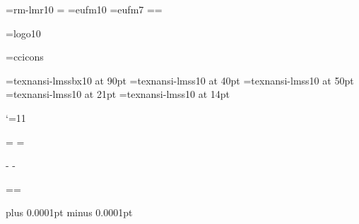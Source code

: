 






\newdimen\hpage \newdimen\vpage %

\def\[{\string\[} %
\def\pdfout#1#2#3{\ifnum#1=1 ^^a7#3 #2\else #2\fi}
\files


\lmfonts\lmtitles\ansifont
 \font\tenrm=rm-lmr10 =\tenrm
\font\frakx=eufm10
\font\frakvii=eufm7
\newfam\frakfam \textfont\frakfam=\frakx \scriptfont\frakfam=\frakvii
\def\frak{\fam\frakfam\frakx}

\font\logo=logo10

\pdfcode
\pdfendcode
\font\ccicons=ccicons
\def\ccbysa{{\ccicons \char0\kern1pt\char1\kern1pt\char2}}

\font\ptitlefont=texnansi-lmssbx10 at 90pt
\font\psubtitlefont=texnansi-lmss10 at 40pt
\font\pauthorfont=texnansi-lmss10 at 50pt
\font\pcitafont=texnansi-lmss10 at 21pt
\font\ptextfont=texnansi-lmss10 at 14pt

\def\pdfBlack{\pdfliteral{0 0 0 1 k 0 0 0 1 K}}
\def\pdfWhite{\pdfliteral{0 0 0 0 k 0 0 0 0 K}}
\def\pdfRed{\pdfliteral{0 1 1 0 k 0 1 1 0 K}}
\def\pdfBlue{\pdfliteral{1 1 0 0 k 1 1 0 0 K}}
\def\pdfGreen{\pdfliteral{1 0 1 0 k 1 0 1 0 K}}

\catcode`\@=11


\let\docinfo\relax \let\infodoc\relax

\headline={\hfil}
\footline={\tenrm\ifodd\pageno \docinfo\hfil\folio
            \else \folio\hfil\infodoc \fi\strut}

\hpage=6in \hsize=10.5cm
 \hoffset\hpage \advance\hoffset-\hsize \divide{}
 \advance\hoffset-1in
\vpage=9in \baselineskip \advance\vsize\topskip %
 \voffset\vpage \advance\voffset-\vsize \advance{}\baselineskip
 \divide{} \advance\voffset-1in

\pdfcode \pdfpageheight=\vpage \pdfpagewidth=\hpage \pdfendcode

\parskip=0pt plus 0.0001pt minus 0.0001pt
\parindent=20pt 
\raggedbottom

\]
